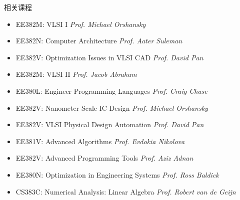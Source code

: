 
\begin{rSection}{相关课程}

\begin{itemize}
\item EE382M:  VLSI  I  \hfill{\em Prof.  Michael  Orshansky}
\item EE382N:  Computer  Architecture  \hfill{\em Prof.  Aater  Suleman} 
\item EE382V:  Optimization  Issues  in  VLSI  CAD  \hfill{\em Prof.  David  Pan}
\item EE382M:  VLSI  II  \hfill{\em Prof.  Jacob  Abraham}
\item EE380L:  Engineer  Programming  Languages  \hfill{\em Prof.  Craig  Chase}
\item EE382V:  Nanometer  Scale  IC  Design  \hfill{\em Prof.  Michael  Orshansky}
\item EE382V:  VLSI  Physical  Design  Automation  \hfill{\em Prof.  David  Pan} 
\item EE381V:  Advanced  Algorithms  \hfill{\em Prof.  Evdokia  Nikolova}
\item EE382V:  Advanced  Programming  Tools  \hfill{\em Prof.  Aziz  Adnan}
\item EE380N:  Optimization in Engineering Systems  \hfill{\em Prof. Ross Baldick}
\item CS383C:  Numerical Analysis: Linear Algebra  \hfill{\em Prof. Robert van de Geijn}
\end{itemize}

\end{rSection}
